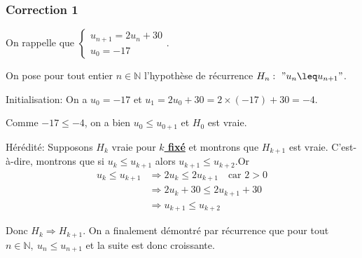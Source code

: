 \documentclass[15pt, mathserif]{beamer}
\begin{document}
\begin{frame}
\vspace{-10mm}
	\frametitle{Correction 1}
\vspace{6.5mm}

On rappelle que $\begin{cases} u_{n+1} = 2u_n+30\\ u_0 = -17\end{cases}$.

\medskip

 On pose pour tout entier $n \in \mathbb{N}$ l'hypothèse de récurrence $H_n:~"u_n  \leq u_{n+1}"$.

\medskip

Initialisation: On a $u_0 =-17$ et $u_1 = 2u_0+30= 2\times\left(-17\right)+30=-4$.

 Comme $-17 \leq -4$, on a bien $u_0  \leq u_{0+1}$ et $H_0$ est vraie.

\medskip

Hérédité: Supposons $H_k$ vraie pour \textbf\underline{{$k$ fixé}} et montrons que $H_{k+1}$ est vraie. C'est-à-dire, montrons que si $u_k  \leq u_{k+1}$ alors $u_{k+1}  \leq u_{k+2}$.Or \begin{align*} u_k  \leq u_{k+1} &\Rightarrow 2u_k \leq 2u_{k+1}\quad \text{car } 2>0\\
	 &\Rightarrow2u_k+30 \leq 2u_{k+1}+30\\
	 &\Rightarrow u_{k+1}  \leq u_{k+2}
\end{align*}

Donc $H_{k} \Rightarrow H_{k+1}$. On a finalement démontré par récurrence que pour tout $n \in\mathbb{N},~ u_n \leq u_{n+1}$ et la suite est donc croissante.\end{frame}
\end{document}
